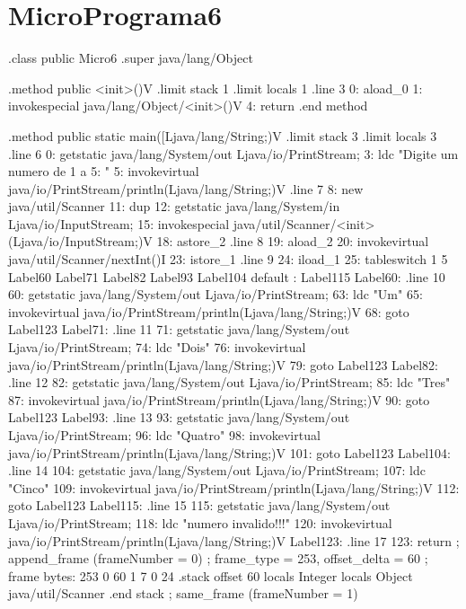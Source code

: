 \documentclass[12pt,a4paper,twoside]{report}
\begin{document}
\section{MicroPrograma6}
\begin{terminal}
.class public Micro6
.super java/lang/Object

.method public <init>()V
  .limit stack 1
  .limit locals 1
  .line 3
  0: aload_0
  1: invokespecial java/lang/Object/<init>()V
  4: return
.end method

.method public static main([Ljava/lang/String;)V
  .limit stack 3
  .limit locals 3
  .line 6
  0: getstatic java/lang/System/out Ljava/io/PrintStream;
  3: ldc "Digite um numero de 1 a 5: "
  5: invokevirtual java/io/PrintStream/println(Ljava/lang/String;)V
  .line 7
  8: new java/util/Scanner
  11: dup
  12: getstatic java/lang/System/in Ljava/io/InputStream;
  15: invokespecial java/util/Scanner/<init>(Ljava/io/InputStream;)V
  18: astore_2
  .line 8
  19: aload_2
  20: invokevirtual java/util/Scanner/nextInt()I
  23: istore_1
  .line 9
  24: iload_1
  25: tableswitch 1 5
          Label60
          Label71
          Label82
          Label93
          Label104
          default : Label115
Label60:
  .line 10
  60: getstatic java/lang/System/out Ljava/io/PrintStream;
  63: ldc "Um"
  65: invokevirtual java/io/PrintStream/println(Ljava/lang/String;)V
  68: goto Label123
Label71:
  .line 11
  71: getstatic java/lang/System/out Ljava/io/PrintStream;
  74: ldc "Dois"
  76: invokevirtual java/io/PrintStream/println(Ljava/lang/String;)V
  79: goto Label123
Label82:
  .line 12
  82: getstatic java/lang/System/out Ljava/io/PrintStream;
  85: ldc "Tres"
  87: invokevirtual java/io/PrintStream/println(Ljava/lang/String;)V
  90: goto Label123
Label93:
  .line 13
  93: getstatic java/lang/System/out Ljava/io/PrintStream;
  96: ldc "Quatro"
  98: invokevirtual java/io/PrintStream/println(Ljava/lang/String;)V
  101: goto Label123
Label104:
  .line 14
  104: getstatic java/lang/System/out Ljava/io/PrintStream;
  107: ldc "Cinco"
  109: invokevirtual java/io/PrintStream/println(Ljava/lang/String;)V
  112: goto Label123
Label115:
  .line 15
  115: getstatic java/lang/System/out Ljava/io/PrintStream;
  118: ldc "numero invalido!!!"
  120: invokevirtual java/io/PrintStream/println(Ljava/lang/String;)V
Label123:
  .line 17
  123: return
  ; append_frame (frameNumber = 0)
  ; frame_type = 253, offset_delta = 60
  ; frame bytes: 253 0 60 1 7 0 24
  .stack
    offset 60
    locals Integer
    locals Object java/util/Scanner
    .end stack
  ; same_frame (frameNumber = 1)

\end{terminal}
\end{document}
